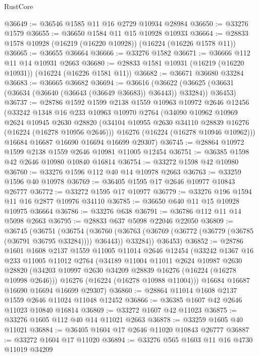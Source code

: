 \begin{lexlean}{RustCore}
\begin{coremodule}
@36649 := @36546 @1585 @11 @16 @2729 @10934 @28984
@36650 := @33276 @1579
@36655 := @36650 @1584 @11 @15 @10928 @10933
@36664 := @28833 @1578 @10928 (@16219 (@16220 @10928)) (@16224 (@16226 @1578 @11))
@36665 := @36655 @36664
@36666 := @33276 @1582
@36671 := @36666 @112 @11 @14 @10931 @2663
@36680 := @28833 @1581 @10931 (@16219 (@16220 @10931)) (@16224 (@16226 @1581 @11))
@36682 := @36671 @36680 @33284
@36683 := @36665 @36682
@36694 := @36616
    (@36622 (@36625 (@36631 (@36634 (@36640 (@36643 (@36649 @36683)) @36443)) @33284)) @36453)
@36737 := @28786
    @1592
    @1599
    @2138
    @1559
    @10963
    @10972
    @2646
    @12456
    (@33242
      @1348
      @16
      @233
      @10963
      @10970
      @2764
      (@34090
        @10962
        @10969
        @2624
        @10945
        @2630
        @28820
        (@34104 @10955 @2630 @34110 @28839 @16276 (@16224 (@16278 @10956 @2646)))
        @16276
        (@16224 (@16278 @10946 @10962)))
      @16684
      @16687
      @16690
      @16694
      @16699
      @29307)
@36745 := @28864 @10972 @1599 @2138 @1559 @2646 @10981 @11005 @12454
@36751 := @36385 @1598 @42 @2646 @10980 @10840 @16814
@36754 := @33272 @1598 @42 @10980
@36760 := @33276 @1596 @112 @40 @14 @10978 @2663
@36763 := @33259 @1596 @40 @10978
@36769 := @36405 @1595 @17 @2646 @10977 @10843 @26777
@36772 := @33272 @1595 @17 @10977
@36779 := @33276 @196 @1594 @11 @16 @2877 @10976 @34110
@36785 := @36650 @640 @11 @15 @10928 @10975 @36664
@36786 := @33276 @638
@36791 := @36786 @112 @11 @14 @5098 @2663
@36795 := @28833 @637 @5098 @22046 @22050
@36809 := @36745
    (@36751
      (@36754
        (@36760 (@36763 (@36769 (@36772 (@36779 (@36785 (@36791 @36795 @33284)))) @36443)) @33284))
      @36453)
@36852 := @28786
    @1601
    @1608
    @2137
    @1559
    @11005
    @11014
    @2646
    @12454
    (@33242
      @1367
      @16
      @233
      @11005
      @11012
      @2764
      (@34189
        @11004
        @11011
        @2624
        @10987
        @2630
        @28820
        (@34203 @10997 @2630 @34209 @28839 @16276 (@16224 (@16278 @10998 @2646)))
        @16276
        (@16224 (@16278 @10988 @11004)))
      @16684
      @16687
      @16690
      @16694
      @16699
      @29307)
@36860 := @28864 @11014 @1608 @2137 @1559 @2646 @11024 @11048 @12452
@36866 := @36385 @1607 @42 @2646 @11023 @10840 @16814
@36869 := @33272 @1607 @42 @11023
@36875 := @33276 @1605 @112 @40 @14 @11021 @2663
@36878 := @33259 @1605 @40 @11021
@36884 := @36405 @1604 @17 @2646 @11020 @10843 @26777
@36887 := @33272 @1604 @17 @11020
@36894 := @33276 @565 @1603 @11 @16 @4730 @11019 @34209

\end{coremodule}
\end{lexlean}
